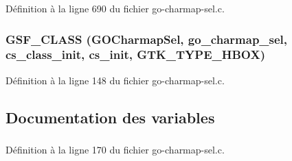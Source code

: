 Définition à la ligne 690 du fichier go-\/charmap-\/sel.c.

\subsubsection[{GSF\_\-CLASS}]{\setlength{\rightskip}{0pt plus 5cm}GSF\_\-CLASS ({\bf GOCharmapSel}, \/  go\_\-charmap\_\-sel, \/  cs\_\-class\_\-init, \/  cs\_\-init, \/  GTK\_\-TYPE\_\-HBOX)}\label{go-charmap-sel_8c_aae247185acba9c3087636aa05049b932}


Définition à la ligne 148 du fichier go-\/charmap-\/sel.c.



\subsection{Documentation des variables}
\subsubsection[{LanguageGroup}]{}\label{go-charmap-sel_8c_acc162ef6fd12567a701dc17144498ff3}


Définition à la ligne 170 du fichier go-\/charmap-\/sel.c.

